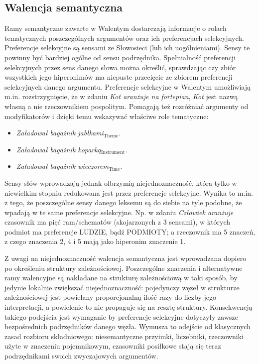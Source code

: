 \documentclass[oneside,pwrcover,withmarginpar,hidelinks,11pt]{article}
\begin{document}
\subsection{Walencja semantyczna}
Ramy semantyczne zawarte w Walentym dostarczają informacje o rolach tematycznych poszczególnych argumentów oraz ich preferencjach selekcyjnych.
Preferencje selekcyjne są sensami ze Słowosieci (lub ich uogólnieniami). Sensy te powinny być bardziej ogólne od sensu podrzędnika.
Spełnialność preferencji selekcyjnych przez sens danego słowa można określić, sprawdzając czy zbiór wszystkich jego hiperonimów ma niepuste przecięcie ze zbiorem preferencji selekcyjnych danego argumentu.
Preferencje selekcyjne w Walentym umożliwiają m.in. rozstrzygnięcie,
że w zdaniu {\it Kot aranżuje na fortepian}, {\it Kot} jest nazwą własną a nie rzeczownikiem pospolitym.
Pomagają też rozróżniać argumenty od modyfikatorów i dzięki temu wskazywać właściwe role tematyczne:
\begin{itemize}
\item {\it Załadował bagażnik jabłkami$_{\text{Theme}}$.}
\item {\it Załadował bagażnik koparką$_{\text{Instrument}}$.}
\item {\it Załadował bagażnik wieczorem$_{\text{Time}}$.}
\end{itemize}

Sensy słów wprowadzają jednak olbrzymią niejednoznaczność,
która tylko w niewielkim stopniu redukowana jest przez preferencje selekcyjne.
Wynika to m.in. z tego, że poszczególne sensy danego leksemu są do siebie na tyle podobne, że wpadają w te same preferencje selekcyjne.
Np. w zdaniu {\it Człowiek aranżuje} 
czasownik ma pięć ram/schematów (skojarzonych z 3 sensami), 
w których podmiot ma preferencje LUDZIE, bądź PODMIOTY;
a rzeczownik ma 5 znaczeń, 
z czego znaczenia 2, 4 i 5 mają jako hiperonim znaczenie 1.

Z uwagi na niejednoznaczność walencja semantyczna jest wprowadzana dopiero po określeniu struktury zależnościowej.
Poszczególne znaczenia i alternatywne ramy walencyjne są nakładane na strukturę zależnościową w taki sposób,
by jedynie lokalnie zwiększać niejednoznaczność:
pojedynczy węzeł w strukturze zależnościowej jest powielany proporcjonalną ilość razy do liczby jego interpretacji, a 
powielenie to nie propaguje się na resztę struktury.
Konsekwencją takiego podejścia jest wymaganie by preferencje selekcyjne dotyczyły zawsze bezpośrednich podrzędników danego węzła.
Wymusza to odejście od klasycznych zasad rozbioru składniowego:
niesemantyczne przyimki, liczebniki, rzeczowniki użyte w znaczeniu pojemnikowym, czasowniki posiłkowe stają się teraz podrzędnikami swoich zwyczajowych argumentów.
\end{document}

